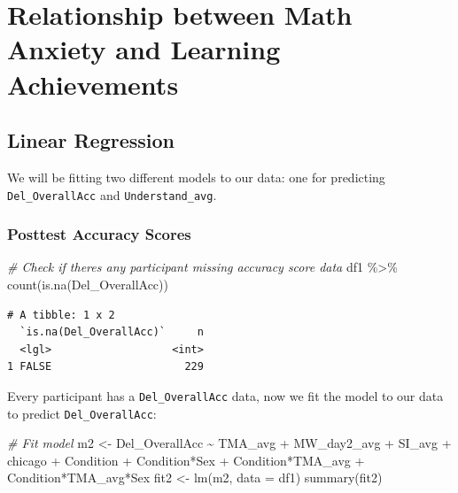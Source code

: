\documentclass[
  letterpaper,
  DIV=11,
  numbers=noendperiod]{scrartcl}
\newenvironment{Shaded}{\begin{snugshade}}{\end{snugshade}}
\newcommand{\AttributeTok}[1]{\textcolor[rgb]{0.49,0.56,0.16}{#1}}
\newcommand{\CommentTok}[1]{\textcolor[rgb]{0.38,0.63,0.69}{\textit{#1}}}
\newcommand{\FunctionTok}[1]{\textcolor[rgb]{0.02,0.16,0.49}{#1}}
\newcommand{\NormalTok}[1]{\textcolor[rgb]{0.00,0.44,0.13}{#1}}
\newcommand{\OtherTok}[1]{\textcolor[rgb]{0.00,0.44,0.13}{#1}}
\newcommand{\SpecialCharTok}[1]{\textcolor[rgb]{0.25,0.44,0.63}{#1}}
\begin{document}
\hypertarget{relationship-between-math-anxiety-and-learning-achievements}{%
\section{Relationship between Math Anxiety and Learning
Achievements}\label{relationship-between-math-anxiety-and-learning-achievements}}

\hypertarget{linear-regression}{%
\subsection{Linear Regression}\label{linear-regression}}

We will be fitting two different models to our data: one for predicting
\texttt{Del\_OverallAcc} and \texttt{Understand\_avg}.

\hypertarget{posttest-accuracy-scores}{%
\subsubsection{Posttest Accuracy
Scores}\label{posttest-accuracy-scores}}

\begin{Shaded}
\begin{Highlighting}[]
\CommentTok{\# Check if there\textquotesingle{}s any participant missing accuracy score data}
\NormalTok{df1 }\SpecialCharTok{\%\textgreater{}\%} \FunctionTok{count}\NormalTok{(}\FunctionTok{is.na}\NormalTok{(Del\_OverallAcc))}
\end{Highlighting}
\end{Shaded}

\begin{verbatim}
# A tibble: 1 x 2
  `is.na(Del_OverallAcc)`     n
  <lgl>                   <int>
1 FALSE                     229
\end{verbatim}

Every participant has a \texttt{Del\_OverallAcc} data, now we fit the
model to our data to predict \texttt{Del\_OverallAcc}:

\begin{Shaded}
\begin{Highlighting}[]
\CommentTok{\# Fit model}
\NormalTok{m2 }\OtherTok{\textless{}{-}}\NormalTok{ Del\_OverallAcc }\SpecialCharTok{\textasciitilde{}}\NormalTok{ TMA\_avg }\SpecialCharTok{+}\NormalTok{ MW\_day2\_avg }\SpecialCharTok{+}\NormalTok{ SI\_avg }\SpecialCharTok{+}\NormalTok{ chicago }\SpecialCharTok{+}\NormalTok{ Condition }\SpecialCharTok{+}\NormalTok{ Condition}\SpecialCharTok{*}\NormalTok{Sex }\SpecialCharTok{+}\NormalTok{ Condition}\SpecialCharTok{*}\NormalTok{TMA\_avg }\SpecialCharTok{+}\NormalTok{ Condition}\SpecialCharTok{*}\NormalTok{TMA\_avg}\SpecialCharTok{*}\NormalTok{Sex}
\NormalTok{fit2 }\OtherTok{\textless{}{-}} \FunctionTok{lm}\NormalTok{(m2, }\AttributeTok{data =}\NormalTok{ df1)}
\FunctionTok{summary}\NormalTok{(fit2)}
\end{Highlighting}
\end{Shaded}
\end{document}
